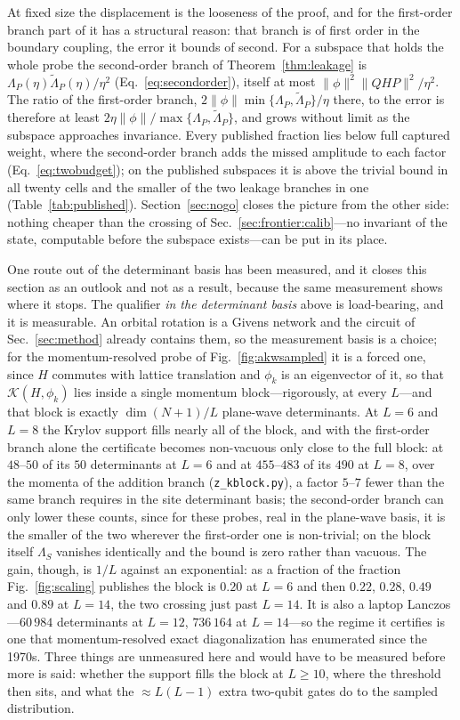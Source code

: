 At fixed size the displacement is the looseness of the proof, and for the first-order branch part of it has a structural reason: that branch is of first order in the boundary coupling, the error it bounds of second. For a subspace that holds the whole probe the second-order branch of Theorem~\ref{thm:leakage} is $\Lambda_P(\eta)\tilde\Lambda_P(\eta)/\eta^{2}$ (Eq.~\eqref{eq:secondorder}), itself at most $\lVert\phi\rVert^{2}\lVert QHP\rVert^{2}/\eta^{2}$. The ratio of the first-order branch, $2\lVert\phi\rVert\min\{\Lambda_P,\tilde\Lambda_P\}/\eta$ there, to the error is therefore at least $2\eta\lVert\phi\rVert/\max\{\Lambda_P,\tilde\Lambda_P\}$, and grows without limit as the subspace approaches invariance. Every published fraction lies below full captured weight, where the second-order branch adds the missed amplitude to each factor (Eq.~\eqref{eq:twobudget}); on the published subspaces it is above the trivial bound in all twenty cells and the smaller of the two leakage branches in one (Table~\ref{tab:published}). Section~\ref{sec:nogo} closes the picture
from the other side: nothing cheaper than the crossing of Sec.~\ref{sec:frontier:calib}---no invariant
of the state, computable before the subspace exists---can be put in its place.

One route out of the determinant basis has been measured, and it closes this section as an outlook and
not as a result, because the same measurement shows where it stops. The qualifier \emph{in the
determinant basis} above is load-bearing, and it is measurable. An orbital rotation is a Givens network
and the circuit of Sec.~\ref{sec:method} already contains them, so the measurement basis is a choice;
for the momentum-resolved probe of Fig.~\ref{fig:akwsampled} it is a forced one, since $H$ commutes with
lattice translation and $\phi_k$ is an eigenvector of it, so that $\mathcal K(H,\phi_k)$ lies inside a
single momentum block---rigorously, at every $L$---and that block is exactly $\dim(N{+}1)/L$
plane-wave determinants. At $L=6$ and $L=8$ the Krylov support fills nearly all of the block, and with the first-order branch alone the certificate becomes non-vacuous only close to the full block: at $48$--$50$ of its $50$ determinants at $L=6$ and at $455$--$483$ of its $490$ at $L=8$, over the momenta of the addition branch (\texttt{z\_kblock.py}), a factor $5$--$7$ fewer than the same branch requires in the site determinant basis; the second-order branch can only lower these counts, since for these probes, real in the plane-wave basis, it is the smaller of the two wherever the first-order one is non-trivial; on the block itself $\Lambda_S$ vanishes identically and the bound is zero rather than vacuous. The gain, though, is $1/L$ against an exponential: as a fraction of
the fraction Fig.~\ref{fig:scaling} publishes the block is $0.20$ at $L=6$ and then $0.22$, $0.28$,
$0.49$ and $0.89$ at $L=14$, the two crossing just past $L=14$. It is also a laptop Lanczos---$60\,984$
determinants at $L=12$, $736\,164$ at $L=14$---so the regime it certifies is one that momentum-resolved
exact diagonalization has enumerated since the 1970s. Three things are unmeasured here and would have to
be measured before more is said: whether the support fills the block at $L\ge10$, where the threshold
then sits, and what the ${\approx}L(L-1)$ extra two-qubit gates do to the sampled distribution.

